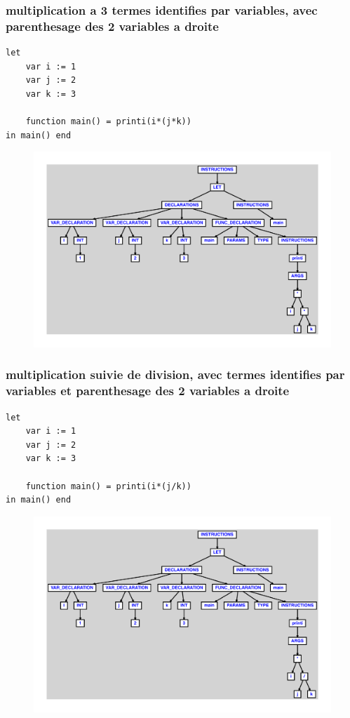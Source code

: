 \documentclass{article}
\begin{document}
\subsubsection{multiplication a 3 termes identifies par variables, avec parenthesage des 2 variables a droite}
\begin{lstlisting}
let
	var i := 1
	var j := 2
	var k := 3

	function main() = printi(i*(j*k))
in main() end
\end{lstlisting}
\newpage
\begin{figure}[H]
\centering
\includegraphics[max width=\textwidth]{ast/ast_117.pdf}
\end{figure}
\newpage
\subsubsection{multiplication suivie de division, avec termes identifies par variables et parenthesage des 2 variables a droite}
\begin{lstlisting}
let
	var i := 1
	var j := 2
	var k := 3

	function main() = printi(i*(j/k))
in main() end
\end{lstlisting}
\newpage
\begin{figure}[H]
\centering
\includegraphics[max width=\textwidth]{ast/ast_118.pdf}
\end{figure}
\newpage
\end{document}
